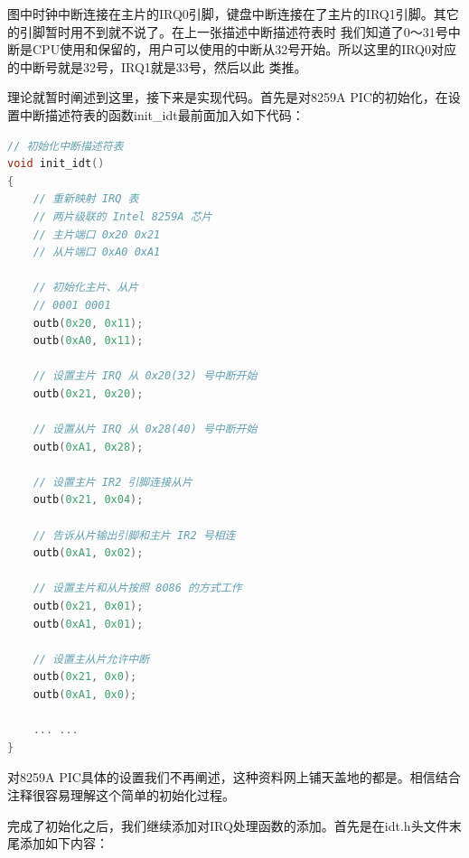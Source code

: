 \par 图中时钟中断连接在主片的IRQ0引脚，键盘中断连接在了主片的IRQ1引脚。其它的引脚暂时用不到就不说了。在上一张描述中断描述符表时\allowbreak
我们知道了0～31号中断是CPU使用和保留的，用户可以使用的中断从32号开始。所以这里的IRQ0对应的中断号就是32号，IRQ1就是33号，然后以此\allowbreak
类推。

\par 理论就暂时阐述到这里，接下来是实现代码。首先是对8259A PIC的初始化，在设置中断描述符表的函数init\_idt最前面加入如下代码：

\begin{lstlisting}[language = C, caption = idt/idt.c]
// 初始化中断描述符表
void init_idt()
{	
	// 重新映射 IRQ 表
	// 两片级联的 Intel 8259A 芯片
	// 主片端口 0x20 0x21
	// 从片端口 0xA0 0xA1
	
	// 初始化主片、从片
	// 0001 0001
	outb(0x20, 0x11);
	outb(0xA0, 0x11);

	// 设置主片 IRQ 从 0x20(32) 号中断开始
	outb(0x21, 0x20);

	// 设置从片 IRQ 从 0x28(40) 号中断开始
	outb(0xA1, 0x28);
	
	// 设置主片 IR2 引脚连接从片
	outb(0x21, 0x04);

	// 告诉从片输出引脚和主片 IR2 号相连
	outb(0xA1, 0x02);
	
	// 设置主片和从片按照 8086 的方式工作
	outb(0x21, 0x01);
	outb(0xA1, 0x01);
	
	// 设置主从片允许中断
	outb(0x21, 0x0);
	outb(0xA1, 0x0);
	
	... ...
}
\end{lstlisting}

\par 对8259A PIC具体的设置我们不再阐述，这种资料网上铺天盖地的都是。相信结合注释很容易理解这个简单的初始化过程。

\par 完成了初始化之后，我们继续添加对IRQ处理函数的添加。首先是在idt.h头文件末尾添加如下内容：

